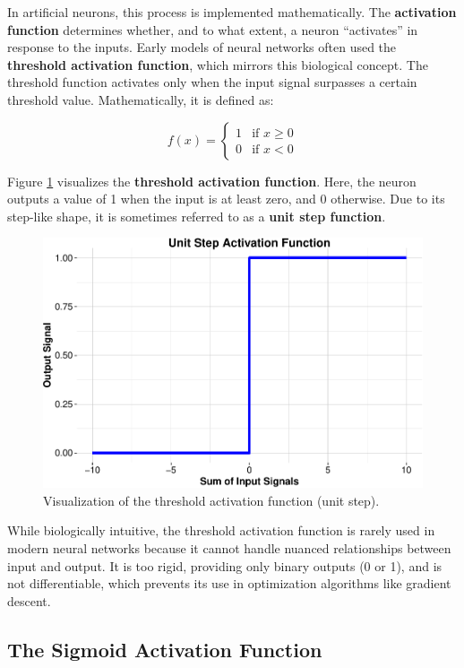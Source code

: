 \documentclass[
]{book}
\theoremstyle{definition}
\theoremstyle{definition}
\theoremstyle{definition}
\theoremstyle{definition}
\theoremstyle{remark}
\begin{document}
In artificial neurons, this process is implemented mathematically. The \textbf{activation function} determines whether, and to what extent, a neuron ``activates'' in response to the inputs. Early models of neural networks often used the \textbf{threshold activation function}, which mirrors this biological concept. The threshold function activates only when the input signal surpasses a certain threshold value. Mathematically, it is defined as:

\[
f(x) = 
\begin{cases} 
1 & \text{if } x \geq 0 \\ 
0 & \text{if } x < 0 
\end{cases}
\]

Figure \ref{fig:active-fun-unit} visualizes the \textbf{threshold activation function}. Here, the neuron outputs a value of 1 when the input is at least zero, and 0 otherwise. Due to its step-like shape, it is sometimes referred to as a \textbf{unit step function}.

\begin{figure}

{\centering \includegraphics[width=0.5\linewidth]{nn_files/figure-latex/active-fun-unit-1} 

}

\caption{Visualization of the threshold activation function (unit step).}\label{fig:active-fun-unit}
\end{figure}

While biologically intuitive, the threshold activation function is rarely used in modern neural networks because it cannot handle nuanced relationships between input and output. It is too rigid, providing only binary outputs (0 or 1), and is not differentiable, which prevents its use in optimization algorithms like gradient descent.

\subsection*{The Sigmoid Activation Function}\label{the-sigmoid-activation-function}
\end{document}
